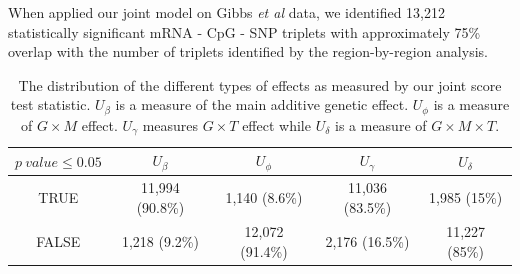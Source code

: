 \documentclass[hidelinks]{article}
\begin{document}


When applied our joint model on Gibbs \emph{et al} data, we identified 13,212 statistically significant mRNA - CpG - SNP triplets with approximately 75\% overlap with the number of triplets identified by the region-by-region analysis. 


\begin{table}[H]
\begin{center}
\begin{tabular}{| c | c | c | c | c |}
\hline
$p~value \leq 0.05$ & $U_\beta$ & $U_\phi$ & $U_\gamma$ & $U_\delta$ \\ \hline \hline
TRUE & 11,994 (90.8\%) &  1,140 (8.6\%) & 11,036 (83.5\%) & 1,985 (15\%) \\ \hline
FALSE & 1,218 (9.2\%) & 12,072 (91.4\%) & 2,176 (16.5\%) & 11,227 (85\%) \\ \hline
\hline\hline
\end{tabular}
\end{center}
\caption{The distribution of the different types of effects as measured by our joint score test statistic. $U_\beta$ is a measure of the main additive genetic effect. $U_\phi$ is a measure of $G \times M$ effect. $U_\gamma$ measures $G \times T$ effect while $U_\delta$ is a measure of $G \times M \times T$.}
\end{table}
\end{document}
